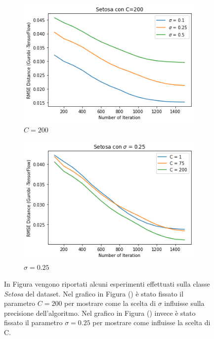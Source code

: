 \documentclass[a4paper,12pt]{report}
\begin{document}
\begin{figure}[H]
    \begin{subfigure}{0.47\textwidth}
        \centering
        \includegraphics[scale=0.5]{images/Grafici/Setosa_C200_sigmaDiversi.png}
        \caption{$C=200$}
        \label{subfig:Setosa_C200_sigmaDiversi}
    \end{subfigure}
    \begin{subfigure}{0.47\textwidth}
        \centering
        \includegraphics[scale=0.5]{images/Grafici/Setosa_Cdiversi_sigma025.png}
        \caption{$\sigma=0.25$}
        \label{subfig:Setosa_Cdiversi_sigma025}
    \end{subfigure}
    \caption{In Figura vengono riportati alcuni esperimenti effettuati sulla classe \textit{Setosa} del dataset. Nel grafico in Figura () è stato fissato il parametro $C=200$ per mostrare come la scelta di $\sigma$ influisse sulla precisione dell'algoritmo. Nel grafico in Figura () invece è stato fissato il parametro $\sigma = 0.25$ per mostrare come influisse la scelta di C.}
    \label{fig:Setosa_Preliminari}
\end{figure}
\end{document}
